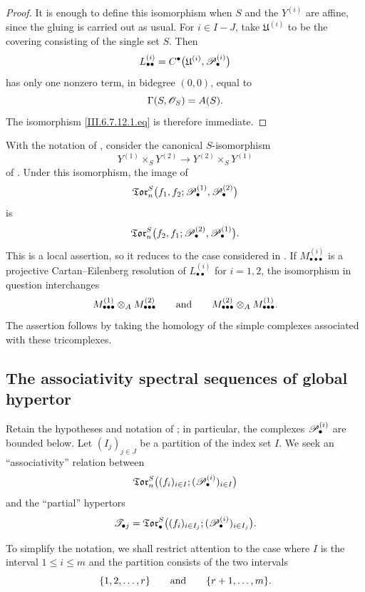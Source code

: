 \begin{proof}
It is enough to define this isomorphism when $S$ and the
$Y^{(i)}$ are affine, since the gluing is carried out as usual.
For $i\in I-J$, take $\mathfrak U^{(i)}$ to be the covering
consisting of the single set $S$.  Then
\[
  L_{\bullet\bullet}^{(i)}
  =
  C^\bullet
  \bigl(
    \mathfrak U^{(i)},\mathscr{P}_\bullet^{(i)}
  \bigr)
\]
has only one nonzero term, in bidegree $(0,0)$, equal to
\[
  \Gamma(S,\mathscr{O}_S)=A(S).
\]
The isomorphism \eqref{III.6.7.12.1.eq} is therefore immediate.
\end{proof}

\begin{remark}[6.7.13]
\label{III.6.7.13}
With the notation of , consider the canonical
$S$-isomorphism
\[
  Y^{(1)}\times_SY^{(2)}
  \longrightarrow
  Y^{(2)}\times_SY^{(1)}
\]
of .  Under this isomorphism, the image of
\[
  \mathfrak{Tor}_n^S
  \bigl(
    f_1,f_2;
    \mathscr{P}_\bullet^{(1)},\mathscr{P}_\bullet^{(2)}
  \bigr)
\]
is
\[
  \mathfrak{Tor}_n^S
  \bigl(
    f_2,f_1;
    \mathscr{P}_\bullet^{(2)},\mathscr{P}_\bullet^{(1)}
  \bigr).
\]
This is a local assertion, so it reduces to the case considered in
.  If
$M_{\bullet\bullet\bullet}^{(i)}$ is a projective
Cartan--Eilenberg resolution of $L_{\bullet\bullet}^{(i)}$ for
$i=1,2$, the isomorphism in question interchanges
\[
  M_{\bullet\bullet\bullet}^{(1)}
  \otimes_A
  M_{\bullet\bullet\bullet}^{(2)}
  \qquad\hbox{and}\qquad
  M_{\bullet\bullet\bullet}^{(2)}
  \otimes_A
  M_{\bullet\bullet\bullet}^{(1)}.
\]
The assertion follows by taking the homology of the simple
complexes associated with these tricomplexes.
\end{remark}

\subsection{The associativity spectral sequences of global hypertor}
\label{subsection:III.6.8}
\label{III.6.8}

\begin{env}[6.8.1]
\label{III.6.8.1}
Retain the hypotheses and notation of ; in
particular, the complexes $\mathscr{P}_\bullet^{(i)}$ are bounded
below.  Let $(I_j)_{j\in J}$ be a partition of the index set $I$.
We seek an ``associativity'' relation between
\[
  \mathfrak{Tor}_n^S
  \bigl(
    (f_i)_{i\in I};
    (\mathscr{P}_\bullet^{(i)})_{i\in I}
  \bigr)
\]
and the ``partial'' hypertors
\[
  \mathscr T_{\bullet j}
  =
  \mathfrak{Tor}_\bullet^S
  \bigl(
    (f_i)_{i\in I_j};
    (\mathscr{P}_\bullet^{(i)})_{i\in I_j}
  \bigr).
\]

To simplify the notation, we shall restrict attention to the case
where $I$ is the interval $1\leq i\leq m$ and the partition
consists of the two intervals
\[
  \{1,2,\ldots,r\}
  \qquad\hbox{and}\qquad
  \{r+1,\ldots,m\}.
\]
\end{env}

